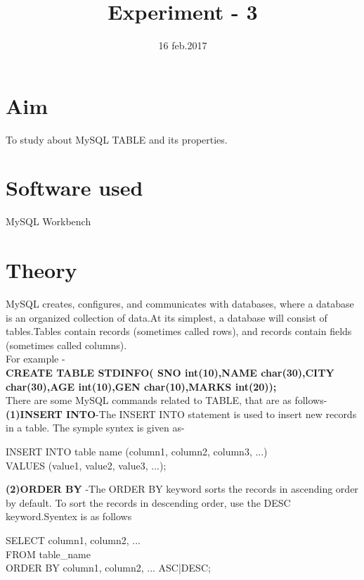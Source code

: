 \documentclass[100pt]{article}
\title{Experiment - 3} %
\date{16 feb.2017} %
\begin{document}
		\maketitle %
    \section{Aim}
    To study about MySQL TABLE and its properties.
	\section{Software used}
	MySQL Workbench
	\section{Theory}
    MySQL creates, configures, and communicates with databases, where a database is an organized collection of data.At its simplest, a database will consist of tables.Tables contain records (sometimes called rows), and records contain fields (sometimes called columns).\\
    For example - \\
           \textbf{ CREATE TABLE STDINFO( SNO int(10),NAME char(30),CITY char(30),AGE int(10),GEN char(10),MARKS int(20)); } \\
   
   
    There are some MySQL commands related to TABLE, that are as follows-\\
    
    \textbf{(1)INSERT INTO}-The INSERT INTO statement is used to insert new records in a table. The symple syntex is given as-\\
       
              \begin{center}
              	INSERT INTO table name (column1, column2, column3, ...)\\
               VALUES (value1, value2, value3, ...);\\
              \end{center}
           
    \textbf{(2)ORDER BY} -The ORDER BY keyword sorts the records in ascending order by default. To sort the records in descending order, use the DESC keyword.Syentex is as follows\\
       
              \begin{center}
              	 SELECT column1, column2, ...\\
                 FROM table_name\\
                 ORDER BY column1, column2, ... ASC|DESC;\\
              \end{center}
   
\end{document}

